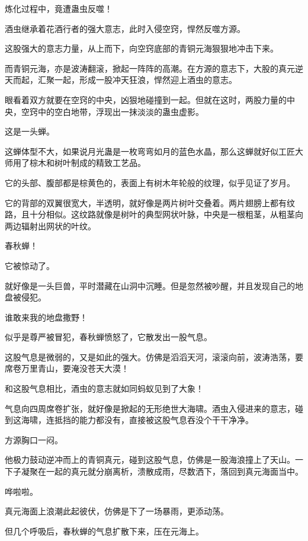 
\begin{this_body}

炼化过程中，竟遭蛊虫反噬！

酒虫继承着花酒行者的强大意志，此时入侵空窍，悍然反噬方源。

这股强大的意志力量，从上而下，向空窍底部的青铜元海狠狠地冲击下来。

而青铜元海，亦是波涛翻滚，掀起一阵阵的高潮。在方源的意志下，大股的真元逆天而起，汇聚一起，形成一股冲天狂浪，悍然迎上酒虫的意志。

眼看着双方就要在空窍的中央，凶狠地碰撞到一起。但就在这时，两股力量的中央，空窍中的空白地带，浮现出一抹淡淡的蛊虫虚影。

这是一头蝉。

这蝉体型不大，如果说月光蛊是一枚弯弯如月的蓝色水晶，那么这蝉就好似工匠大师用了棕木和树叶制成的精致工艺品。

它的头部、腹部都是棕黄色的，表面上有树木年轮般的纹理，似乎见证了岁月。

它的背部的双翼很宽大，半透明，就好像是两片树叶交叠着。两片翅膀上都有纹路，且十分相似。这纹路就像是树叶的典型网状叶脉，中央是一根粗茎，从粗茎向两边辐射出网状的叶纹。

春秋蝉！

它被惊动了。

就好像是一头巨兽，平时潜藏在山洞中沉睡。但是忽然被吵醒，并且发现自己的地盘被侵犯。

谁敢来我的地盘撒野！

似乎是尊严被冒犯，春秋蝉愤怒了，它散发出一股气息。

这股气息是微弱的，又是如此的强大。仿佛是滔滔天河，滚滚向前，波涛浩荡，要席卷万里青山，要淹没苍天大漠！

和这股气息相比，酒虫的意志就如同蚂蚁见到了大象！

气息向四周席卷扩张，就好像是掀起的无形绝世大海啸。酒虫入侵进来的意志，碰到这海啸，连抵挡的能力都没有，直接被这股气息吞没个干干净净。

方源胸口一闷。

他极力鼓动逆冲而上的青铜真元，碰到这股气息，仿佛是一股海浪撞上了天山。一下子凝聚在一起的真元就分崩离析，溃散成雨，尽数洒下，落回到真元海面当中。

哗啦啦。

真元海面上浪潮此起彼伏，仿佛是下了一场暴雨，更添动荡。

但几个呼吸后，春秋蝉的气息扩散下来，压在元海上。


\end{this_body}
